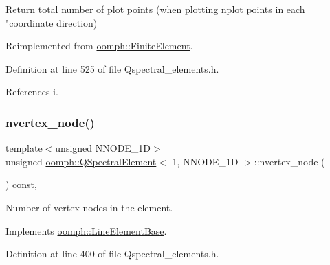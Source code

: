 Return total number of plot points (when plotting nplot points in each "coordinate direction) 



Reimplemented from \hyperlink{classoomph_1_1FiniteElement_a8ed563c7ff0cfd8bafdbb0132b388106}{oomph\+::\+Finite\+Element}.



Definition at line 525 of file Qspectral\+\_\+elements.\+h.



References i.

\mbox{\label{classoomph_1_1QSpectralElement_3_011_00_01NNODE__1D_01_4_afbc5b62a126b6fcce8fffcd0a4b37b86}} 
\subsubsection{\texorpdfstring{nvertex\+\_\+node()}{nvertex\_node()}}
{\footnotesize\ttfamily template$<$unsigned N\+N\+O\+D\+E\+\_\+1D$>$ \\
unsigned \hyperlink{classoomph_1_1QSpectralElement}{oomph\+::\+Q\+Spectral\+Element}$<$ 1, N\+N\+O\+D\+E\+\_\+1D $>$\+::nvertex\+\_\+node (\begin{DoxyParamCaption}{ }\end{DoxyParamCaption}) const\hspace{0.3cm}{\ttfamily [inline]}, {\ttfamily [virtual]}}



Number of vertex nodes in the element. 



Implements \hyperlink{classoomph_1_1LineElementBase_ad80307523c850d58bca7b925df15e46d}{oomph\+::\+Line\+Element\+Base}.



Definition at line 400 of file Qspectral\+\_\+elements.\+h.

\mbox{\label{classoomph_1_1QSpectralElement_3_011_00_01NNODE__1D_01_4_a9f8defda0dbde54edfb84353c6f3f794}} 
